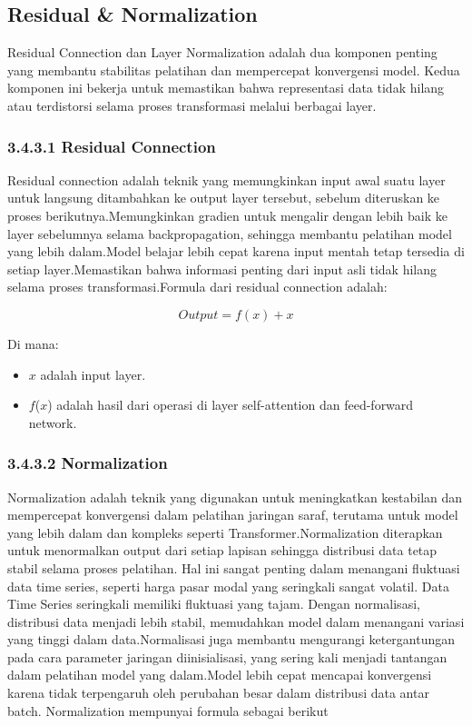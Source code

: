 \subsection{Residual \& Normalization}
Residual Connection dan Layer Normalization adalah dua komponen penting yang membantu stabilitas pelatihan dan mempercepat konvergensi model. Kedua komponen ini bekerja untuk memastikan bahwa representasi data tidak hilang atau terdistorsi selama proses transformasi melalui berbagai layer.

\newpage
\subsubsection*{3.4.3.1 Residual Connection}
Residual connection adalah teknik yang memungkinkan input awal suatu layer untuk langsung ditambahkan ke output layer tersebut, sebelum diteruskan ke proses berikutnya.Memungkinkan gradien untuk mengalir dengan lebih baik ke layer sebelumnya selama backpropagation, sehingga membantu pelatihan model yang lebih dalam.Model belajar lebih cepat karena input mentah tetap tersedia di setiap layer.Memastikan bahwa informasi penting dari input asli tidak hilang selama proses transformasi.Formula dari residual connection adalah: 

\begin{equation}
Output = f(x) + x
\end{equation}

Di mana: 
\begin{itemize}
        \item \( x \) adalah input layer.
        \item \( f \)(\( x \)) adalah hasil dari operasi di layer self-attention dan feed-forward network.
    \end{itemize}


\subsubsection*{3.4.3.2 Normalization}
Normalization adalah teknik yang digunakan untuk meningkatkan kestabilan dan mempercepat konvergensi dalam pelatihan jaringan saraf, terutama untuk model yang lebih dalam dan kompleks seperti Transformer.Normalization diterapkan untuk menormalkan output dari setiap lapisan sehingga distribusi data tetap stabil selama proses pelatihan. Hal ini sangat penting dalam menangani fluktuasi data time series, seperti harga pasar modal yang seringkali sangat volatil. Data Time Series seringkali memiliki fluktuasi yang tajam. Dengan normalisasi, distribusi data menjadi lebih stabil, memudahkan model dalam menangani variasi yang tinggi dalam data.Normalisasi juga membantu mengurangi ketergantungan pada cara parameter jaringan diinisialisasi, yang sering kali menjadi tantangan dalam pelatihan model yang dalam.Model lebih cepat mencapai konvergensi karena tidak terpengaruh oleh perubahan besar dalam distribusi data antar batch. Normalization mempunyai formula sebagai berikut

